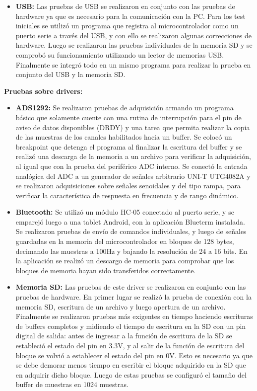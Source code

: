 \begin{itemize}
\item \textbf{USB:} Las pruebas de USB se realizaron en conjunto con las pruebas de hardware ya que es necesario para la comunicación con la PC. Para los test iniciales se utilizó un programa que registra al microcontrolador como un puerto serie a través del USB, y con ello se realizaron algunas correcciones de hardware. Luego se realizaron las pruebas individuales de la memoria SD y se comprobó su funcionamiento utilizando un lector de memorias USB. Finalmente se integró todo en un mismo programa para realizar la prueba en conjunto del USB y la memoria SD.

\end{itemize}


\textbf{Pruebas sobre drivers:}


\begin{itemize}

\item \textbf{ADS1292:} Se realizaron pruebas de adquisición armando un programa básico que solamente cuente con una rutina de interrupción para el pin de aviso de datos disponibles (DRDY) y una tarea que permita realizar la copia de las muestras de los canales habilitados hacia un buffer. Se colocó un breakpoint que detenga el programa al finalizar la escritura del buffer y se realizó una descarga de la memoria a un archivo para verificar la adquisición, al igual que con la prueba del periférico ADC interno. Se conectó la entrada analógica del ADC a un generador de señales arbitrario UNI-T UTG4082A y se realizaron adquisiciones sobre señales senoidales y del tipo rampa, para verificar la característica de respuesta en frecuencia y de rango dinámico. 

\item \textbf{Bluetooth:} Se utilizó un módulo HC-05 conectado al puerto serie, y se emparejó luego a una tablet Android, con la aplicación Blueterm\citep{pymasde2013} instalada. Se realizaron pruebas de envío de comandos individuales, y luego de señales guardadas en la memoria del microcontrolador en bloques de 128 bytes, decimando las muestras a 100Hz y bajando la resolución de 24 a 16 bits. En la aplicación se realizó un descargo de memoria para comprobar que los bloques de memoria hayan sido transferidos correctamente.

\item \textbf{Memoria SD:} Las pruebas de este driver se realizaron en conjunto con las pruebas de hardware. En primer lugar se realizó la prueba de conexión con la memoria SD, escritura de un archivo y luego apertura de un archivo. Finalmente se realizaron pruebas más exigentes en tiempo haciendo escrituras de buffers completos y midiendo el tiempo de escritura en la SD con un pin digital de salida: antes de ingresar a la función de escritura de la SD se estableció el estado del pin en 3.3V, y al salir de la función de escritura del bloque se volvió a establecer el estado del pin en 0V. Esto es necesario ya que se debe demorar menos tiempo en escribir el bloque adquirido en la SD que en adquirir dicho bloque. Luego de estas pruebas se configuró el tamaño del buffer de muestras en 1024 muestras.

\end{itemize}

